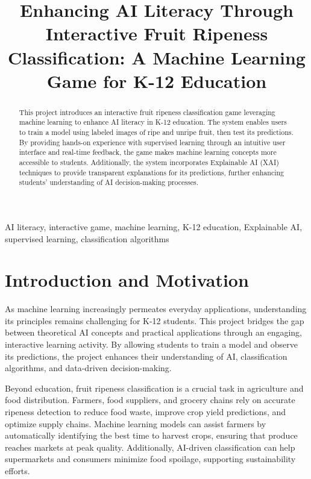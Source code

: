\documentclass[conference]{IEEEtran}
\begin{document}
\title{Enhancing AI Literacy Through Interactive Fruit Ripeness Classification: A Machine Learning Game for K-12 Education}

\author{
}

\maketitle

\begin{abstract}
This project introduces an interactive fruit ripeness classification game leveraging machine learning to enhance AI literacy in K-12 education. The system enables users to train a model using labeled images of ripe and unripe fruit, then test its predictions. By providing hands-on experience with supervised learning through an intuitive user interface and real-time feedback, the game makes machine learning concepts more accessible to students. Additionally, the system incorporates Explainable AI (XAI) techniques to provide transparent explanations for its predictions, further enhancing students' understanding of AI decision-making processes.
\end{abstract}

\begin{IEEEkeywords}
AI literacy, interactive game, machine learning, K-12 education, Explainable AI, supervised learning, classification algorithms
\end{IEEEkeywords}

\section{Introduction and Motivation}
As machine learning increasingly permeates everyday applications, understanding its principles remains challenging for K-12 students. This project bridges the gap between theoretical AI concepts and practical applications through an engaging, interactive learning activity. By allowing students to train a model and observe its predictions, the project enhances their understanding of AI, classification algorithms, and data-driven decision-making.

Beyond education, fruit ripeness classification is a crucial task in agriculture and food distribution. Farmers, food suppliers, and grocery chains rely on accurate ripeness detection to reduce food waste, improve crop yield predictions, and optimize supply chains. Machine learning models can assist farmers by automatically identifying the best time to harvest crops, ensuring that produce reaches markets at peak quality. Additionally, AI-driven classification can help supermarkets and consumers minimize food spoilage, supporting sustainability efforts.
\end{document}
